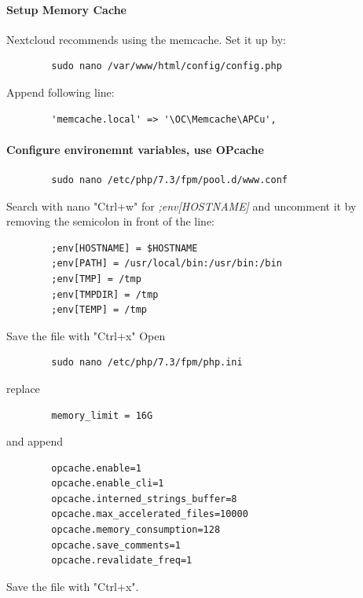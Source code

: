 \documentclass[a4paper,12pt]{article}
\begin{document}
	\paragraph{Setup Memory Cache}
	Nextcloud recommends using the memcache. Set it up by:
	\begin{verbatim}
		sudo nano /var/www/html/config/config.php
	\end{verbatim}
	Append following line:
	\begin{verbatim}
		'memcache.local' => '\OC\Memcache\APCu',
	\end{verbatim}
	\paragraph{Configure environemnt variables, use OPcache}
	\begin{verbatim}
		sudo nano /etc/php/7.3/fpm/pool.d/www.conf
	\end{verbatim}
	Search with nano "Ctrl+w" for \textit{;env[HOSTNAME]} and uncomment it by removing the semicolon in front of the line:
	\begin{verbatim}
		;env[HOSTNAME] = $HOSTNAME
		;env[PATH] = /usr/local/bin:/usr/bin:/bin
		;env[TMP] = /tmp
		;env[TMPDIR] = /tmp
		;env[TEMP] = /tmp
	\end{verbatim}
	Save the file with "Ctrl+x"\newline
	Open
	\begin{verbatim}
		sudo nano /etc/php/7.3/fpm/php.ini
	\end{verbatim}
	replace 
	\begin{verbatim}
		memory_limit = 16G
	\end{verbatim}
	and append
	\begin{verbatim}
		opcache.enable=1
		opcache.enable_cli=1
		opcache.interned_strings_buffer=8
		opcache.max_accelerated_files=10000
		opcache.memory_consumption=128
		opcache.save_comments=1
		opcache.revalidate_freq=1
	\end{verbatim}
	Save the file with "Ctrl+x".
\end{document}

